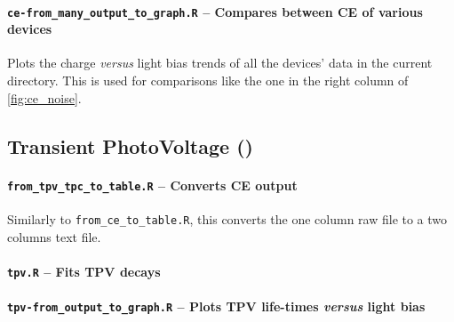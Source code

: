 		\paragraph{\texttt{ce-from\_many\_output\_to\_graph.R} -- Compares between CE of various devices}
		Plots the charge \textsl{versus} light bias trends of all the devices' data in the current directory.
		This is used for comparisons like the one in the right column of \cref{fig:ce_noise}.
		

	\subsection{Transient PhotoVoltage ()}\label{r_tpv}

		\paragraph{\texttt{from\_tpv\_tpc\_to\_table.R} -- Converts CE output}
		Similarly to \texttt{from\_ce\_to\_table.R}, this converts the one column raw file to a two columns text file.

		\paragraph{\texttt{tpv.R} -- Fits TPV decays}
		
%		
%				
		\paragraph{\texttt{tpv-from\_output\_to\_graph.R} -- Plots TPV life\hyp{}times \textsl{versus} light bias}
%		
%		
%

